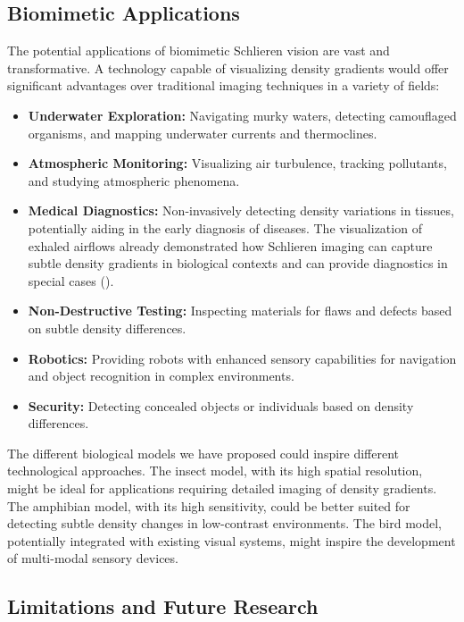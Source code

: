 \documentclass[11pt]{article}
\begin{document}
\subsection{Biomimetic Applications}

The potential applications of biomimetic Schlieren vision are vast and transformative. A technology capable of visualizing density gradients would offer significant advantages over traditional imaging techniques in a variety of fields:
\begin{itemize}
    \item \textbf{Underwater Exploration:} Navigating murky waters, detecting camouflaged organisms, and mapping underwater currents and thermoclines.
    \item \textbf{Atmospheric Monitoring:} Visualizing air turbulence, tracking pollutants, and studying atmospheric phenomena.
    \item \textbf{Medical Diagnostics:} Non-invasively detecting density variations in tissues, potentially aiding in the early diagnosis of diseases. The visualization of exhaled airflows already demonstrated how Schlieren imaging can capture subtle density gradients in biological contexts and can provide diagnostics in special cases (\cite{Xu2017Exhalation, Tang2011Schlieren}). 
    \item \textbf{Non-Destructive Testing:} Inspecting materials for flaws and defects based on subtle density differences.
    \item \textbf{Robotics:} Providing robots with enhanced sensory capabilities for navigation and object recognition in complex environments.
    \item \textbf{Security:} Detecting concealed objects or individuals based on density differences.
\end{itemize}
The different biological models we have proposed could inspire different technological approaches. The insect model, with its high spatial resolution, might be ideal for applications requiring detailed imaging of density gradients. The amphibian model, with its high sensitivity, could be better suited for detecting subtle density changes in low-contrast environments. The bird model, potentially integrated with existing visual systems, might inspire the development of multi-modal sensory devices.

\subsection{Limitations and Future Research}
\end{document}
